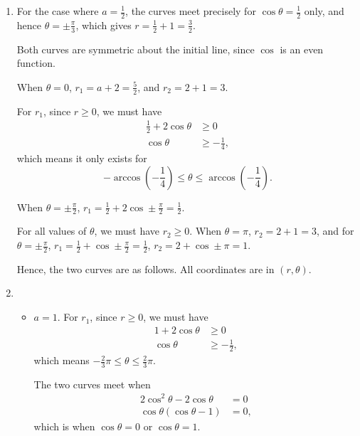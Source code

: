 \begin{enumerate}
    \item For the case where \(a = \frac{1}{2}\), the curves meet precisely for \(\cos \theta = \frac{1}{2}\) only, and hence \(\theta = \pm \frac{\pi}{3}\), which gives \(r = \frac{1}{2} + 1 = \frac{3}{2}\).

          Both curves are symmetric about the initial line, since \(\cos\) is an even function.

          When \(\theta = 0\), \(r_1 = a + 2 = \frac{5}{2}\), and \(r_2 = 2 + 1 = 3\).

          For \(r_1\), since \(r \geq 0\), we must have
          \begin{align*}
              \frac{1}{2} + 2 \cos \theta & \geq 0              \\
              \cos \theta                 & \geq - \frac{1}{4},
          \end{align*}
          which means it only exists for
          \[
              -\arccos \left(-\frac{1}{4}\right) \leq \theta \leq \arccos \left(-\frac{1}{4}\right).
          \]

          When \(\theta = \pm \frac{\pi}{2}\), \(r_1 = \frac{1}{2} + 2 \cos \pm \frac{\pi}{2} = \frac{1}{2}\).

          For all values of \(\theta\), we must have \(r_2 \geq 0\). When \(\theta = \pi\), \(r_2 = 2 + 1 = 3\), and for \(\theta = \pm \frac{\pi}{2}\), \(r_1 = \frac{1}{2} + \cos \pm \frac{\pi}{2} = \frac{1}{2}\), \(r_2 = 2 + \cos \pm \pi = 1\).

          Hence, the two curves are as follows. All coordinates are in \((r, \theta)\).
          \begin{center}
              
          \end{center}

    \item \begin{itemize}
              \item \(a = 1\). For \(r_1\), since \(r \geq 0\), we must have
                    \begin{align*}
                        1 + 2 \cos \theta & \geq 0             \\
                        \cos \theta       & \geq -\frac{1}{2},
                    \end{align*}
                    which means \(-\frac{2}{3} \pi \leq \theta \leq \frac{2}{3}\pi\).

                    The two curves meet when
                    \begin{align*}
                        2 \cos^2 \theta - 2 \cos \theta & = 0  \\
                        \cos \theta (\cos \theta - 1)   & = 0,
                    \end{align*}
                    which is when \(\cos \theta = 0\) or \(\cos \theta = 1\).


\end{itemize}
\end{enumerate}
